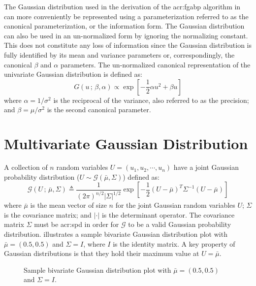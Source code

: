 The Gaussian distribution used in the derivation of the \gls{acr:fgabp} algorithm in  can more conveniently be represented using a parameterization referred to as the canonical parameterization, or the information form.
The Gaussian distribution can also be used in an un-normalized form by ignoring the normalizing constant.
This does not constitute any loss of information since the Gaussian distribution is fully identified by its mean and variance parameters or, correspondingly, the canonical $\beta$ and $\alpha$ parameters.
The un-normalized canonical representation of the univariate Gaussian distribution is defined as:
\begin{equation}
	G(u\,;\,\beta,\alpha) \propto \exp\left[-\frac{1}{2}\alpha u^2 + \beta u\right]
	\label{eqn:gassDisUnivarCan}
\end{equation}
where $\alpha = 1/\sigma^2$ is the reciprocal of the variance, also referred to as the precision; and $\beta = \mu/\sigma^2$ is the second canonical parameter.


\section{Multivariate Gaussian Distribution}

A collection of $n$ random variables $U=(u_1,u_2,\cdots,u_n)$ have a joint Gaussian probability distribution ($U\sim\mathcal{G}(\bar{\mu},\Sigma)$)  defined as:
\begin{equation}
	\mathcal{G}(U\,;\,\bar{\mu},\Sigma) \triangleq \frac{1}{(2\pi)^{n/2}|\Sigma|^{1/2}} \exp\left[-\frac{1}{2}(U-\bar{\mu})^T\Sigma^{-1}(U-\bar{\mu})\right]
	\label{eqn:gausDisMult}
\end{equation}
where $\bar{\mu}$ is the mean vector of size $n$ for the joint Gaussian random variables $U$; $\Sigma$ is the covariance matrix; and $|\cdot|$ is the determinant operator.
The covariance matrix $\Sigma$ must be \acrfull{acr:spd} in order for $\mathcal{G}$ to be a valid Gaussian probability distribution.
 illustrates a sample bivariate Gaussian distribution plot with $\bar{\mu} = (0.5,0.5)$ and $\Sigma=I$, where $I$ is the identity matrix.
A key property of Gaussian distributions is that they hold their maximum value at $U=\bar{\mu}$.
\begin{figure}
	\caption[Sample bivariate Gaussian distribution plot.]{Sample bivariate Gaussian distribution plot with $\bar{\mu} = (0.5,0.5)$ and $\Sigma=I$.}
	\label{fig:gauPlot3D}
\end{figure}


